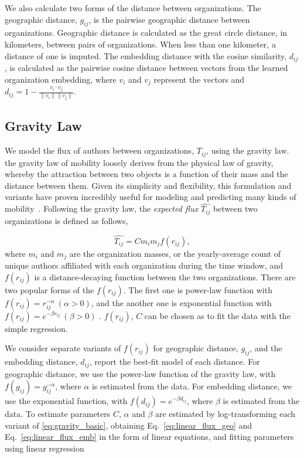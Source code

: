 \documentclass[12pt]{article} %
\begin{document}
We also calculate two forms of the distance between organizations.
The geographic distance, $g_{ij}$, is the pairwise geographic distance between organizations.
Geographic distance is calculated as the great circle distance, in kilometers, between pairs of organizations.
When less than one kilometer, a distance of one is imputed.
The embedding distance with the cosine similarity, $d_{ij}$, is calculated as the pairwise cosine distance between vectors from the learned organization embedding, where $v_{i}$ and $v_{j}$ represent the vectors and $d_{ij} = 1 - \frac{v_{i} \cdot v_{j}}{\lVert v_{i} \rVert \lVert v_{j} \rVert}$.


%
%
\subsection*{Gravity Law}

We model the flux of authors between organizations, $T_{ij}$, using the gravity law.
the gravity law of mobility loosely derives from the physical law of gravity, whereby the attraction between two objects is a function of their mass and the distance between them.
Given its simplicity and flexibility, this formulation and variants have proven incredibly useful for modeling and predicting many kinds of mobility~\autocite{jung2008highwaygravity, curiel2018citygravity, lewer2008immigrationgravity, xia2005measlesgravity, truscott2012epidemicgravity, hong2016busgravity}.
Following the gravity law, the \textit{expected flux} $\hat{T_{ij}}$ between two organizations is defined as follows,

\begin{equation}
	\label{eq:gravity_basic}
	\hat{T_{ij}} = Cm_{i}m_{j}f(r_{ij}),
\end{equation}
where $m_{i}$ and $m_{j}$ are the organization masses, or the yearly-average count of unique authors affiliated with each organization during the time window, and $f(r_{ij})$ is a distance-decaying function  between the two organizations. There are two popular forms of the $f(r_{ij})$. The first one is power-law function with $f(r_{ij})= r^{-\alpha}_{ij} \ (\alpha > 0)$, and the another one is exponential function with $f(r_{ij}) = e^{-\beta r_{ij}} \ (\beta > 0)$ \autocite{chen2015distance}.  $f(r_{ij})$, $C$ can be chosen as to fit the data with the simple regression.

We consider separate variants of $f(r_{ij})$ for geographic distance, $g_{ij}$, and the embedding distance, $d_{ij}$, report the best-fit model of each distance.
For geographic distance, we use the power-law function of the gravity law, with $f(g_{ij})= g^{-\alpha}_{ij}$, where $\alpha$ is estimated from the data.
For embedding distance, we use the exponential function, with $f(d_{ij}) = e^{-\beta d_{ij}}$, where $\beta$ is estimated from the data.
To estimate parameters $C$, $\alpha$ and $\beta$ are estimated by log-transforming each variant of \ref{eq:gravity_basic}, obtaining Eq.~\ref{eq:linear_flux_geo} and Eq.~\ref{eq:linear_flux_emb} in the form of linear equations, and fitting parameters using linear regression
\end{document}
